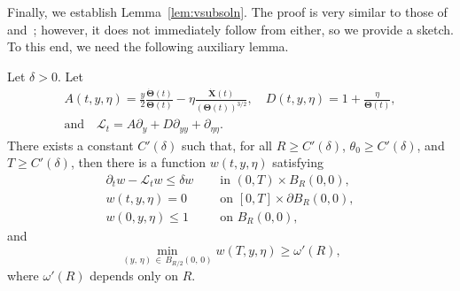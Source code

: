 \documentclass[AHL,Unicode,longabstracts]{cedram}
\newcommand{\bX}{\mathbf{X}}
\newcommand{\mL}{\mathcal{L}}
\newcommand{\bTheta}{\boldsymbol{\Theta}}
\newcommand{\1}{\mathds{1}}
\begin{document}
Finally, we establish Lemma~\ref{lem:vsubsoln}. The proof is very similar to those of~\cite[Lemma~4.1]{BHR_acceleration} and~\cite[Lemma~13]{BouinChanHendersonKim}; however, it does not immediately follow from either, so we provide a sketch. To this end, we need the following auxiliary lemma.
\begin{lemm}\label{lem:aux to v subsoln}
Let $\delta>0$. Let
\begin{multline*}
A(t,y,\eta)=\frac{y}{2}\frac{\dot{\bTheta}(t)}{\bTheta(t)} - \eta \frac{\dot{\bX}(t)}{(\bTheta(t))^{3/2}}, \quad D(t,y,\eta)= 1+\frac{\eta}{\bTheta(t)}, \\
\text{and}\quad
\mL_t = A\partial_y+D\partial_{yy}+\partial_{\eta \eta}.
\end{multline*}
There exists a constant $C'(\delta)$ such that, for all $R\geq C'(\delta)$, $\theta_0\geq C'(\delta)$, and $T\geq C'(\delta)$, then there is a function $w(t,y,\eta)$ satisfying
\begin{align}
\partial_tw -\mL_t w \leq \delta w \quad &\text{ in } (0,T)\times B_R(0,0),\label{eq:w}\\
w(t,y,\eta) =0 \quad &\text{ on }[0,T]\times \partial B_R(0,0),\label{eq:w on bdry}\\
w(0,y,\eta)\leq 1 \quad &\text{ on }B_R(0,0),\label{eq:w ub}
\end{align}
and
\begin{equation}\label{eq:w lb}
\min_{(y,\,\eta)\,\in\,B_{R/2}(0,\,0)}w(T,y,\eta) \geq \omega'(R),
\end{equation}
where $\omega'(R)$ depends only on $R$.
\end{lemm}
\end{document}
